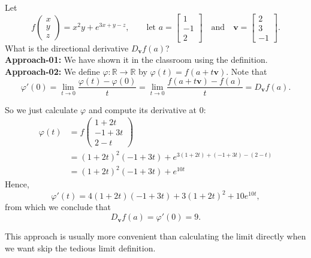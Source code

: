 \begin{example}
    Let
\[
f\!\left(\begin{array}{c}
x\\
y\\
z
\end{array}\right)=x^2y+e^{3x+y-z},
\qquad
\text{let } a=
\left[\begin{array}{c}
1\\
-1\\
2
\end{array}\right]
\quad \text{and} \quad
\mathbf{v}=
\left[\begin{array}{c}
2\\
3\\
-1
\end{array}\right].
\]
What is the directional derivative \(D_{\mathbf{v}}f(a)\)?\\
\textbf{Approach-01:} We have shown it in the classroom using the definition.\\
\textbf{Approach-02:}
We define \(\varphi:\mathbb{R}\to\mathbb{R}\) by \(\varphi(t)=f(a+t\mathbf{v})\). Note that
\[
\varphi'(0)
=
\lim_{t\to 0}\frac{\varphi(t)-\varphi(0)}{t}
=
\lim_{t\to 0}\frac{f(a+t\mathbf{v})-f(a)}{t}
=
D_{\mathbf{v}}f(a).
\]

So we just calculate \(\varphi\) and compute its derivative at \(0\):
\begin{align*}
\varphi(t)
&=
f\!\left(\begin{array}{c}
1+2t\\
-1+3t\\
2-t
\end{array}\right)\\
&=(1+2t)^2(-1+3t)+e^{3(1+2t)+(-1+3t)-(2-t)}\\
&=(1+2t)^2(-1+3t)+e^{10t}
\end{align*}
Hence,
\[
\varphi'(t)
=
4(1+2t)(-1+3t)+3(1+2t)^2+10e^{10t},
\]
from which we conclude that
\[
D_{\mathbf{v}}f(a)=\varphi'(0)=9.
\]

This approach is usually more convenient than calculating the limit directly when we want skip the tedious limit definition.  
\end{example}
